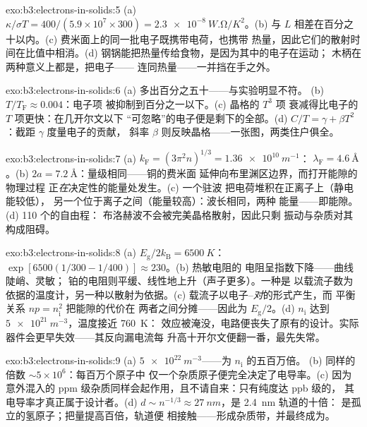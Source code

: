 \begin{solution}{exo:b3:electrons-in-solids:5}
(a) $\kappa/\sigma T = 400/(5.9\times10^7\times300) =
\qty{2.3e-8}{W.\ohm/K^2}$。(b) 与 $L$ 相差在百分之十以内。(c)
费米面上的同一批电子既携带电荷，也携带
热量，因此它们的散射时间在比值中相消。(d)
钢锅能把热量传给食物，是因为其中的电子在运动；
木柄在两种意义上都是，把电子——
连同热量——一并挡在手之外。
\end{solution}

\begin{solution}{exo:b3:electrons-in-solids:6}
(a) 多出百分之五十——与实验明显不符。
(b) $T/T_{\text{F}} \approx 0.004$：电子项
被抑制到百分之一以下。(c) 晶格的 $T^3$ 项
衰减得比电子的 $T$ 项更快：在几开尔文以下
“可忽略”的电子便是剩下的全部。(d) $C/T =
\gamma + \beta T^2$：截距 $\gamma$ 度量电子的贡献，
斜率 $\beta$ 则反映晶格——一张图，两类住户俱全。
\end{solution}

\begin{solution}{exo:b3:electrons-in-solids:7}
(a) $k_{\text{F}} = (3\pi^2n)^{1/3} = \qty{1.36e10}{m^{-1}}$：
$\lambda_{\text{F}} = \qty{4.6}{\angstrom}$。(b) $2a =
\qty{7.2}{\angstrom}$：量级相同——铜的费米面
延伸向布里渊区边界，而打开能隙的物理过程
正\emph{在}决定性的能量处发生。(c) 一个驻波
把电荷堆积在正离子上（静电能较低），
另一个位于离子之间（能量较高）：波长相同，两种
能量——即能隙。(d) 110 个的自由程：
布洛赫波不会被完美晶格散射，因此只剩
振动与杂质对其构成阻碍。
\end{solution}

\begin{solution}{exo:b3:electrons-in-solids:8}
(a) $E_{\text{g}}/2k_{\text{B}} = \qty{6500}{K}$：
$\exp[6500(1/300 - 1/400)] \approx 230$。(b) 热敏电阻的
电阻呈指数下降——曲线陡峭、灵敏；
铂的电阻则平缓、线性地上升（声子更多）。一种是
以载流子数为依据的温度计，另一种以散射为依据。(c)
载流子以电子–\emph{对}的形式产生，而
平衡关系 $np = n_{\text{i}}^2$ 把能隙的代价在
两者之间分摊——因此为 $E_{\text{g}}/2$。(d)
$n_{\text{i}}$ 达到 $\qty{5e21}{m^{-3}}$，温度接近 \qty{760}{K}：
效应被淹没，电路便丧失了原有的设计。实际
器件会更早失效——其反向漏电流每
升高十开尔文便翻一番，最先失常。
\end{solution}

\begin{solution}{exo:b3:electrons-in-solids:9}
(a) $\qty{5e22}{m^{-3}}$——为 $n_{\text{i}}$ 的五百万倍。
(b) 同样的倍数 $\sim5\times10^6$：每百万个原子中
仅一个杂质原子便完全决定了电导率。(c) 因为意外混入的 ppm
级杂质同样会起作用，且不请自来：只有纯度达 ppb 级的，
其电导率才真正属于设计者。(d) $d \sim n^{-1/3}
\approx \qty{27}{nm}$，是 \qty{2.4}{nm} 轨道的十倍：
是孤立的氢原子；把量提高百倍，轨道便
相接触——形成杂质带，并最终成为。
\end{solution}

